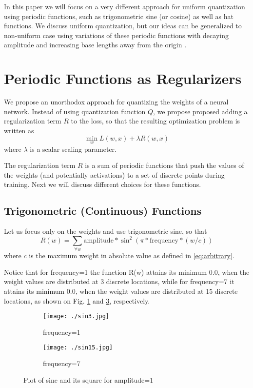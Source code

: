 \documentclass{article}
\newcommand{\squeeze}{\vspace{-2.5mm}}
\begin{document}
In this paper we will focus on a very different approach for uniform quantization using periodic functions, such as trigonometric sine (or cosine) as well as hat functions. We discuss uniform quantization, but our ideas can be generalized to non-uniform case using variations of these periodic functions with decaying amplitude and increasing base lengths away from the origin \cite{Stenger1993,Strang2008}.

\section{Periodic Functions as Regularizers}

We propose an unorthodox approach for quantizing the weights of a neural network. Instead of using quantization function $Q$, we propose proposed adding a regularization term $R$ to the loss, so that the resulting optimization problem is written as
\begin{equation}
\min_w L(w,x) + \lambda R(w,x)
\label{eq:orig_reg}
\end{equation}
where $\lambda$ is a scalar scaling parameter.

The regularization term $R$ is a sum of periodic functions that push the values of the weights (and potentially activations) to a set of discrete points during training. Next we will discuss different choices for these functions.

\subsection{Trigonometric (Continuous) Functions}
Let us focus only on the weights and use trigonometric sine, so that
\begin{equation}
R(w) = \sum_{\forall w} \text{amplitude} * \sin^2 (\pi * \text{frequency} * (w/c))
\label{eq:sin_con}
\end{equation}
where $c$ is the maximum weight in absolute value as defined in \eqref{eq:arbitrary}.

Notice that for frequency=1 the function R(w) attains its minimum 0.0, when the weight values are distributed at 3 discrete locations, while for frequency=7 it attains its minimum 0.0, when the weight values are distributed at 15 discrete locations, as shown on Fig. \ref{fig:sin3} and \ref{fig:sin15}, respectively.

\begin{figure}[h]
 \begin{center}
  \begin{subfigure}[b]{0.49\textwidth}
   \texttt{[image: ./sin3.jpg]}
   \caption{frequency=1}
   \label{fig:sin3}
  \end{subfigure}
  \begin{subfigure}[b]{0.49\textwidth}
   \texttt{[image: ./sin15.jpg]}
   \caption{frequency=7}
   \label{fig:sin15}
  \end{subfigure}
  \caption{Plot of sine and its square for amplitude=1}
  \squeeze \squeeze
 \end{center}
\end{figure}
\end{document}
